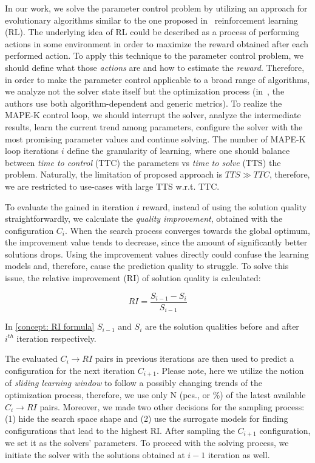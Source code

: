 In our work, we solve the parameter control problem by utilizing an approach for evolutionary algorithms similar to the one proposed in~\cite{karafotias2014generic} reinforcement learning (RL). The underlying idea of RL could be described as a process of performing actions in some environment in order to maximize the reward obtained after each performed action. To apply this technique to the parameter control problem, we should define what those \emph{actions} are and how to estimate the \emph{reward}. Therefore, in order to make the parameter control applicable to a broad range of algorithms, we analyze not the solver state itself but the optimization process (in~\cite{karafotias2014generic}, the authors use both algorithm-dependent and generic metrics). To realize the MAPE-K control loop, we should interrupt the solver, analyze the intermediate results, learn the current trend among parameters, configure the solver with the most promising parameter values and continue solving. The number of MAPE-K loop iterations $i$ define the granularity of learning, where one should balance between \emph{time to control} (TTC) the parameters vs \emph{time to solve} (TTS) the problem. Naturally, the limitation of proposed approach is $TTS \gg TTC$, therefore, we are restricted to use-cases with large TTS w.r.t. TTC.

To evaluate the gained in iteration $i$ reward, instead of using the solution quality straightforwardly, we calculate the \emph{quality improvement}, obtained with the configuration $C_i$. When the search process converges towards the global optimum, the improvement value tends to decrease, since the amount of significantly better solutions drops. Using the improvement values directly could confuse the learning models and, therefore, cause the prediction quality to struggle. To solve this issue, the relative improvement (RI) of solution quality is calculated: 

\begin{equation}
RI = \frac{S_{i-1} - S_{i}}{S_{i-1}}
\label{concept: RI formula}
\end{equation}

In \cref{concept: RI formula} $S_{i-1}$ and $S_i$ are the solution qualities before and after $i^{th}$ iteration respectively.

The evaluated $C_i \rightarrow RI$ pairs in previous iterations are then used to predict a configuration for the next iteration $C_{i+1}$. Please note, here we utilize the notion of \emph{sliding learning window} to follow a possibly changing trends of the optimization process, therefore, we use only N (pcs., or \%) of the latest available $C_i \rightarrow RI$ pairs. Moreover, we made two other decisions for the sampling process: (1) hide the search space shape and (2) use the surrogate models for finding configurations that lead to the highest RI. After sampling the $C_{i+1}$ configuration, we set it as the solvers' parameters. To proceed with the solving process, we initiate the solver with the solutions obtained at $i-1$ iteration as well.

